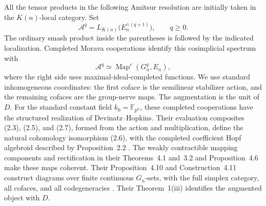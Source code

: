 All the tensor products in the following Amitsur resolution are
initially taken in the \(K(n)\)-local category. Set
\begin{equation}
\mathcal A^q=
L_{K(n)}\bigl(E_n^{\wedge(q+1)}\bigr),\qquad q\geq0.
\label{spec:amitsur}
\end{equation}
The ordinary smash product inside the parentheses is followed by the
indicated localization. Completed Morava cooperations identify this
cosimplicial spectrum with
\[
\mathcal A^q\simeq\operatorname{Map}^c(G_n^q,E_n),
\]
where the right side uses maximal-ideal-completed functions. We use
standard inhomogeneous coordinates: the first coface is the
semilinear stabilizer action, and the remaining cofaces are the
group-nerve maps. The augmentation is the unit of \(D\).
For the standard constant field \(k_0=\mathbb F_{p^n}\), these
completed cooperations have the structured realization of
Devinatz--Hopkins. Their evaluation composites (2.3), (2.5), and
(2.7), formed from the action and multiplication, define the natural
cohomology isomorphism (2.6), with the completed coefficient Hopf
algebroid described by Proposition~2.2
\cite[Proposition~2.2 and (2.3), (2.5)--(2.7)]{DevinatzHopkins}.
The weakly contractible mapping components and rectification in their
Theorems~4.1 and~3.2 and Proposition~4.6 make these maps coherent.
Their Proposition~4.10 and Construction~4.11 construct diagrams over
finite continuous \(G_n\)-sets, with the full simplex category,
all cofaces, and all codegeneracies
\cite[Theorems~3.2 and~4.1, Propositions~4.6 and~4.10, and
Construction~4.11]{DevinatzHopkins}. Their Theorem~1(iii) identifies
the augmented object with \(D\).

